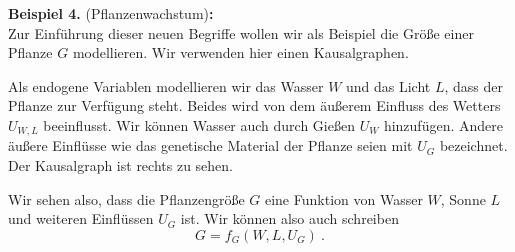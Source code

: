 \documentclass[headsepline,11pt,bibliography=leveldown]{scrbook}
\newcounter{NewZaehler}
\newcommand{\NewZahl}{\refstepcounter{NewZaehler}4.\theNewZaehler}
\newenvironment{NewBeispiel}[1]{\par\medskip\textbf{Beispiel \NewZahl} #1\textbf{:}\\}{\par\medskip}
\begin{document}
\begin{NewBeispiel}{(Pflanzenwachstum)}
Zur Einführung dieser neuen Begriffe wollen wir als Beispiel die Größe einer Pflanze $G$ modellieren. Wir verwenden hier einen Kausalgraphen.\\

\begin{minipage}{0.5\linewidth}
Als endogene Variablen modellieren wir das Wasser $W$ und das Licht $L$, dass der Pflanze zur Verfügung steht. Beides wird von dem äußerem Einfluss des Wetters $U_{W, L}$ beeinflusst. Wir können Wasser auch durch Gießen $U_W$ hinzufügen. Andere äußere Einflüsse wie das genetische Material der Pflanze seien mit $U_G$ bezeichnet. Der Kausalgraph ist rechts zu sehen.\\
\end{minipage}
\begin{minipage}{0.5\linewidth}
\begin{center}
\end{center}
\end{minipage}

Wir sehen also, dass die Pflanzengröße $G$ eine Funktion von Wasser $W$, Sonne $L$ und weiteren Einflüssen $U_G$ ist. Wir können also auch schreiben
\[G = f_G(W, L, U_G)~.\]

\begin{minipage}{0.5\linewidth}
\begin{center}
\end{center}
\end{minipage}
\end{NewBeispiel}
\end{document}
